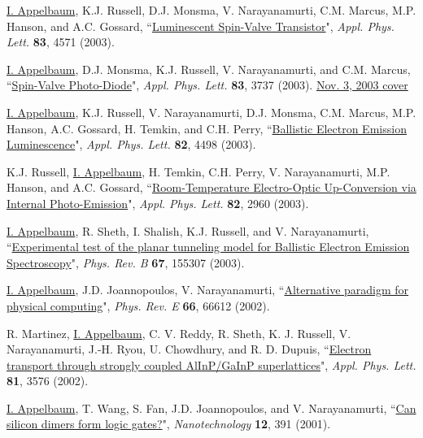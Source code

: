 \documentclass[paper=letter,fontsize=11pt]{scrartcl} %
\newcommand{\PaperEntry}[7]{
		\noindent #1, ``\href{#7}{#2}", \textit{#3} \textbf{#4}, #5 (#6).}
\begin{document}
\begin{etaremune}
\item\PaperEntry{\underline{I. Appelbaum}, K.J. Russell, D.J. Monsma, V. Narayanamurti, C.M. Marcus, M.P. Hanson, and A.C. Gossard}{Luminescent Spin-Valve Transistor}{Appl. Phys. Lett.}{83}{4571}{2003}{http://link.aip.org/link/doi/10.1063/1.1630838}

\item\PaperEntry{\underline{I. Appelbaum}, D.J. Monsma, K.J. Russell, V. Narayanamurti, and C.M. Marcus}{Spin-Valve Photo-Diode}{Appl. Phys. Lett.}{83}{3737}{2003}{http://dx.doi.org/10.1063/1.1623315} \href{http://scitation.aip.org/apl/covers/83_18.jsp}{Nov. 3, 2003 cover} 

\item\PaperEntry{\underline{I. Appelbaum}, K.J. Russell, V. Narayanamurti, D.J. Monsma, C.M. Marcus, M.P. Hanson, A.C. Gossard, H. Temkin, and C.H. Perry}{Ballistic Electron Emission Luminescence}{Appl. Phys. Lett.}{82}{4498}{2003}{http://dx.doi.org/10.1063/1.1584524} 

\item\PaperEntry{K.J. Russell, \underline{I. Appelbaum}, H. Temkin, C.H. Perry, V. Narayanamurti, M.P. Hanson, and A.C. Gossard}{Room-Temperature Electro-Optic Up-Conversion via Internal Photo-Emission}{Appl. Phys. Lett.}{82}{2960}{2003}{http://link.aip.org/link/doi/10.1063/1.1571981}

\item\PaperEntry{\underline{I. Appelbaum}, R. Sheth, I. Shalish, K.J. Russell, and V. Narayanamurti}{Experimental test of the planar tunneling model for Ballistic Electron Emission Spectroscopy}{Phys. Rev. B}{67}{155307}{2003}{http://dx.doi.org/10.1103/PhysRevB.67.155307} 

\item\PaperEntry{\underline{I. Appelbaum}, J.D. Joannopoulos, V. Narayanamurti}{Alternative paradigm for physical computing}{Phys. Rev. E}{66}{66612}{2002}{http://dx.doi.org/10.1103/PhysRevE.66.066612}

\item\PaperEntry{R. Martinez, \underline{I. Appelbaum}, C. V. Reddy, R. Sheth, K. J. Russell, V. Narayanamurti, J.-H. Ryou, U. Chowdhury, and R. D. Dupuis}{Electron transport through strongly coupled AlInP/GaInP superlattices}{Appl. Phys. Lett.}{81}{3576}{2002}{http://dx.doi.org/10.1063/1.1519350}

\item\PaperEntry{\underline{I. Appelbaum}, T. Wang, S. Fan, J.D. Joannopoulos, and V. Narayanamurti}{Can silicon dimers form logic gates?}{Nanotechnology}{12}{391}{2001}{http://dx.doi.org/10.1088/0957-4484/12/3/330}


\end{etaremune}
\end{document}
